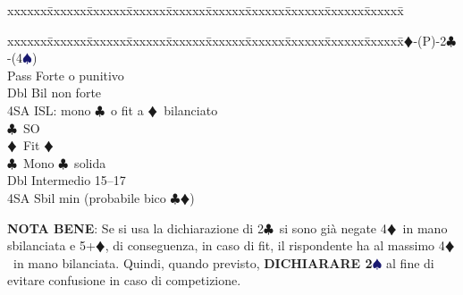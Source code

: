 \documentclass[a4paper,italian]{article}
\newcommand{\BC}{\textcolor{OliveGreen}{$\clubsuit$}}
\newcommand{\BD}{\textcolor{RedOrange}{$\vardiamondsuit$}}
\newcommand{\BS}{\textcolor{MidnightBlue}{$\spadesuit${}}}
\newenvironment{bidtable}
{\begin{tabbing}

    xxxxxx\=xxxxxx\=xxxxxx\=xxxxxx\=xxxxxx\=xxxxxx\=xxxxxx\=xxxxxx\=xxxxxx\=xxxxxx\=\kill}
{\end{tabbing} }%
\newenvironment{attenzione}[1]
{\begin{tcolorbox}[colframe=red!80!white,title=#1]}
    {
\end{tcolorbox} }%
\begin{document}
\begin{attenzione}{Interferenze}
\begin{bidtable}
                                        \end{bidtable}
                                        \bigbreak
                                        \begin{bidtable}
                                            1\BD-(P)-2\BC-(4\BS)\+\\
                                            Pass \> Forte o punitivo\\
                                            \>Dbl Bil non forte\\
                                            \>4SA ISL: mono \BC\ o fit a \BD\ bilanciato\\
                                            \> \BC\ SO\\
                                            \> \> \BD\ Fit \BD\\
                                            \BC\ Mono \BC\ solida\\

                                            Dbl \> Intermedio 15--17\\
                                            4SA \> Sbil min (probabile bico \BC \BD )\\
                                        \end{bidtable}

                                        \textbf{NOTA BENE}: Se si usa la dichiarazione di 2\BC\ si sono già negate 4\BD\ in mano sbilanciata e 5+\BD, di conseguenza, in caso di fit, il rispondente ha al massimo 4\BD\ in mano bilanciata. Quindi, quando previsto, \textbf{DICHIARARE 2\BS} al fine di evitare confusione in caso di competizione.
                                    \end{attenzione}
\end{document}

